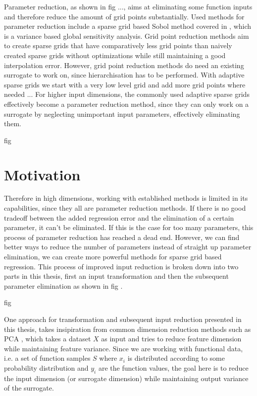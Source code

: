 \documentclass[
  a4paper,  %
  twoside,  %
  bibliography=totoc,
  headsepline,
  cleardoublepage=empty,
  parskip=half,
  draft=false
]{scrbook}
\begin{document}
Parameter reduction, as shown in fig ..., aims at eliminating some function inputs and therefore reduce the amount of grid points substantially.
Used methods for parameter reduction include a sparse grid based Sobol method covered in \cite{}, which is a variance based global sensitivity analysis.
Grid point reduction methods aim to create sparse grids that have comparatively less grid points than naively created sparse grids without optimizations while still maintaining a good interpolation error.
However, grid point reduction methods do need an existing surrogate to work on, since hierarchisation has to be performed.
With adaptive sparse grids we start with a very low level grid and add more grid points where needed ...
For higher input dimensions, the commonly used adaptive sparse grids effectively become a parameter reduction method, since they can only work on a surrogate by neglecting unimportant input parameters, effectively eliminating them.

fig

\section{Motivation}

Therefore in high dimensions, working with established methods is limited in its capabilities, since they all are parameter reduction methods.
If there is no good tradeoff between the added regression error and the elimination of a certain parameter, it can't be eliminated. If this is the case for too many parameters, this process of parameter reduction has reached a dead end.
However, we can find better ways to reduce the number of parameters instead of straight up parameter elimination, we can create more powerful methods for sparse grid based regression.
This process of improved input reduction is broken down into two parts in this thesis, first an input transformation and then the subsequent parameter elimination as shown in fig .

fig

One approach for transformation and subsequent input reduction presented in this thesis, takes insipiration from common dimension reduction methods such as PCA , which takes a dataset $X$ as input and tries to reduce feature dimension while maintaining feature variance.
Since we are working with functional data, i.e. a set of function samples $S$ where $x_i$ is distributed according to some probability distribution and $y_i$ are the function values, the goal here is to reduce the input dimension (or surrogate dimension) while maintaining output variance of the surrogate.
\end{document}
